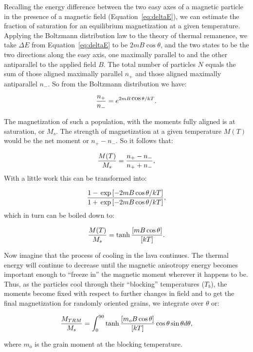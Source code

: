 Recalling the energy difference between the two easy axes of a magnetic
particle in the presence of a magnetic field (Equation~\ref{eq:deltaE}), 
we can estimate the fraction of saturation for an equilibrium magnetization
at a given temperature.
 Applying the 
 Boltzmann distribution law to 
the theory of thermal remanence, we take $\Delta E$ from Equation~\ref{eq:deltaE} to be $2mB\cos \theta$, and the two states to be the two directions along the easy axis, one maximally parallel to and the other antiparallel to the applied field $B$.  
The total number of particles $N$ equals the sum of those aligned maximally parallel
$n_+$ and those aligned maximally antiparallel $n_-$.   So from the Boltzmann distribution we have:

$$
{ {n_+}\over{n_-} } = e^ {\-2mB\cos \theta/kT}.
$$

\noindent The magnetization of such a
population, with the moments fully aligned is at saturation, or $M_s$.  The strength of  magnetization
at a given temperature $M (T)$  would be the net moment or $n_+-n_-$.  So it follows that:

$$
{{M(T)} \over {M_s}}  = {{n_+ -n_-}\over {n_+ +n_-}},
$$
\noindent
With a little work this can be transformed into:

$$
{{1- \exp [-2mB\cos \theta / kT]} \over {1 + \exp [-2mB \cos \theta / kT]}},
$$
which in turn can be boiled down to:

$$
{{M(T)} \over {M_s}} = \tanh {{[mB \cos \theta]}\over {[kT]}}.
$$

 Now imagine that the process of cooling in the lava continues.
  The thermal energy
will continue to decrease until the magnetic
  anisotropy energy becomes important enough to  ``freeze in''
the magnetic moment wherever it happens to be.     Thus, as the particles cool through their
 ``blocking'' temperatures ($T_b$), the moments become fixed with respect to further changes in field and to get the final magnetization for randomly oriented grains, we integrate over $\theta$ or:

\begin{equation}
{{M_{TRM}} \over {M_s}} = \int_0^{90} \tanh {{[m_oB\cos
\theta]}\over{[kT]}} \cos \theta \sin
\theta d\theta,
\label{eq:trm}
\end{equation} 

\noindent where $m_o$ is the grain moment at the blocking temperature.  


